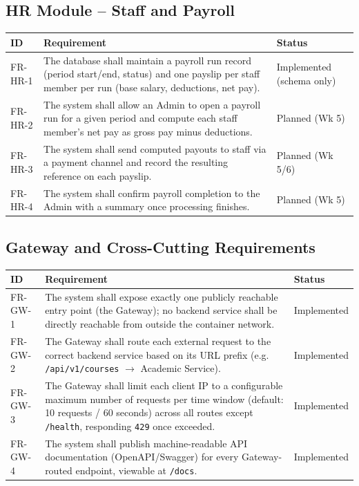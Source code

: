 \documentclass[11pt,a4paper]{report}
\begin{document}
\subsection{HR Module -- Staff and Payroll}
\begin{longtable}{p{1.9cm} L{10.3cm} p{2.1cm}}
\toprule
\textbf{ID} & \textbf{Requirement} & \textbf{Status} \\
\midrule
\endhead
FR-HR-1 & The database shall maintain a payroll run record (period start/end, status) and one payslip per staff member per run (base salary, deductions, net pay). & Implemented (schema only) \\
FR-HR-2 & The system shall allow an Admin to open a payroll run for a given period and compute each staff member's net pay as gross pay minus deductions. & Planned (Wk 5) \\
FR-HR-3 & The system shall send computed payouts to staff via a payment channel and record the resulting reference on each payslip. & Planned (Wk 5/6) \\
FR-HR-4 & The system shall confirm payroll completion to the Admin with a summary once processing finishes. & Planned (Wk 5) \\
\bottomrule
\end{longtable}

\subsection{Gateway and Cross-Cutting Requirements}
\begin{longtable}{p{1.9cm} L{10.3cm} p{2.1cm}}
\toprule
\textbf{ID} & \textbf{Requirement} & \textbf{Status} \\
\midrule
\endhead
FR-GW-1 & The system shall expose exactly one publicly reachable entry point (the Gateway); no backend service shall be directly reachable from outside the container network. & Implemented \\
FR-GW-2 & The Gateway shall route each external request to the correct backend service based on its URL prefix (e.g. \texttt{/api/v1/courses} $\rightarrow$ Academic Service). & Implemented \\
FR-GW-3 & The Gateway shall limit each client IP to a configurable maximum number of requests per time window (default: 10 requests / 60 seconds) across all routes except \texttt{/health}, responding \texttt{429} once exceeded. & Implemented \\
FR-GW-4 & The system shall publish machine-readable API documentation (OpenAPI/Swagger) for every Gateway-routed endpoint, viewable at \texttt{/docs}. & Implemented \\
\bottomrule
\end{longtable}
\end{document}
